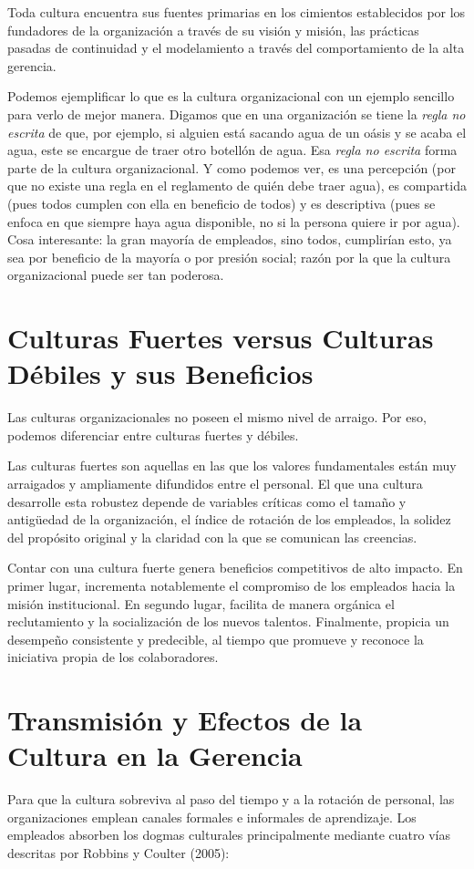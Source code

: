 \documentclass{article}
\begin{document}
    Toda cultura encuentra sus fuentes primarias en los cimientos establecidos por los fundadores de la organización a través de su visión y misión, las prácticas pasadas de continuidad y el modelamiento a través del comportamiento de la alta gerencia.

    Podemos ejemplificar lo que es la cultura organizacional con un ejemplo sencillo para verlo de mejor manera. Digamos que en una organización se tiene la \textit{regla no escrita} de que, por ejemplo, si alguien está sacando agua de un oásis y se acaba el agua, este se encargue de traer otro botellón de agua. Esa \textit{regla no escrita} forma parte de la cultura organizacional. Y como podemos ver, es una percepción (por que no existe una regla en el reglamento de quién debe traer agua), es compartida (pues todos cumplen con ella en beneficio de todos) y es descriptiva (pues se enfoca en que siempre haya agua disponible, no si la persona quiere ir por agua). Cosa interesante: la gran mayoría de empleados, sino todos, cumplirían esto, ya sea por beneficio de la mayoría o por presión social; razón por la que la cultura organizacional puede ser tan poderosa.

    \section{Culturas Fuertes versus Culturas Débiles y sus Beneficios}
    Las culturas organizacionales no poseen el mismo nivel de arraigo. Por eso, podemos diferenciar entre culturas fuertes y débiles. 
    
    Las culturas fuertes son aquellas en las que los valores fundamentales están muy arraigados y ampliamente difundidos entre el personal. El que una cultura desarrolle esta robustez depende de variables críticas como el tamaño y antigüedad de la organización, el índice de rotación de los empleados, la solidez del propósito original y la claridad con la que se comunican las creencias.

    Contar con una cultura fuerte genera beneficios competitivos de alto impacto. En primer lugar, incrementa notablemente el compromiso de los empleados hacia la misión institucional. En segundo lugar, facilita de manera orgánica el reclutamiento y la socialización de los nuevos talentos. Finalmente, propicia un desempeño consistente y predecible, al tiempo que promueve y reconoce la iniciativa propia de los colaboradores.

    \section{Transmisión y Efectos de la Cultura en la Gerencia}
    Para que la cultura sobreviva al paso del tiempo y a la rotación de personal, las organizaciones emplean canales formales e informales de aprendizaje. Los empleados absorben los dogmas culturales principalmente mediante cuatro vías descritas por Robbins y Coulter (2005):
\end{document}
